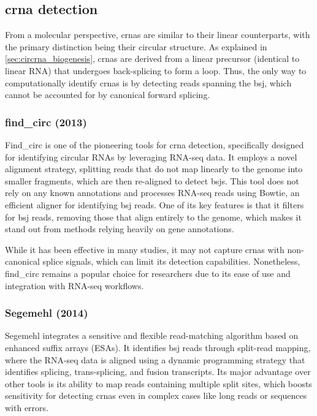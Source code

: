 \subsection{\gls{crna} detection}
\label{subsec:circrna_detection}
From a molecular perspective, \gls{crna}s are similar to their linear
counterparts, with the primary distinction being their circular structure.
As explained in \cref{sec:circrna_biogenesis}, \gls{crna}s are derived from a
linear precursor (identical to linear RNA) that undergoes back-splicing to form
a loop.
Thus, the only way to computationally identify \gls{crna}s is by detecting
reads spanning the \gls{bsj}, which cannot be accounted for by canonical
forward splicing.

\subsubsection{find\_circ (2013)\supercite{memczak_circular_2013}}
Find\_circ is one of the pioneering tools for \gls{crna} detection,
specifically designed for identifying circular RNAs by leveraging RNA-seq data.
It employs a novel alignment strategy, splitting reads that do not map linearly
to the genome into smaller fragments, which are then re-aligned to detect
\gls{bsj}s\supercite{memczak_circular_2013}.
This tool does not rely on any known annotations and processes RNA-seq reads
using Bowtie, an efficient aligner for identifying \gls{bsj} reads.
One of its key features is that it filters for \gls{bsj} reads, removing those
that align entirely to the genome, which makes it stand out from methods
relying heavily on gene annotations\supercite{memczak_circular_2013}.

While it has been effective in many studies, it may not capture \gls{crna}s
with non-canonical splice signals, which can limit its detection
capabilities\supercite{sekar_circular_2018,liu_prkra_2022}.
Nonetheless, find\_circ remains a popular choice for researchers due to its
ease of use and integration with RNA-seq workflows.

\subsubsection{Segemehl (2014)\supercite{hoffmann_multi-split_2014}}
Segemehl integrates a sensitive and flexible read-matching algorithm based on
enhanced suffix arrays (ESAs).
It identifies \gls{bsj} reads through split-read mapping, where the RNA-seq
data is aligned using a dynamic programming strategy that identifies splicing,
trans-splicing, and fusion transcripts.
Its major advantage over other tools is its ability to map reads containing
multiple split sites, which boosts sensitivity for detecting \gls{crna}s even
in complex cases like long reads or sequences with
errors\supercite{hoffmann_multi-split_2014}.

